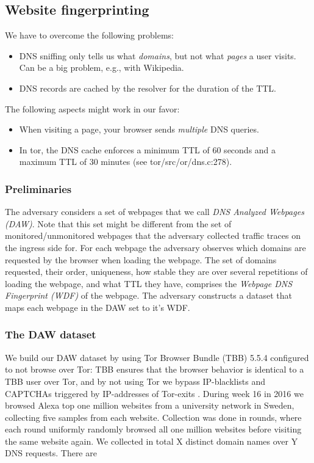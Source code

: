\subsection{Website fingerprinting}
We have to overcome the following problems:
\begin{itemize}
	\item DNS sniffing only tells us what \emph{domains}, but not what
		\emph{pages} a user visits.  Can be a big problem, e.g., with Wikipedia.
	\item DNS records are cached by the resolver for the duration of the TTL.
\end{itemize}

The following aspects might work in our favor:
\begin{itemize}
	\item When visiting a page, your browser sends \emph{multiple} DNS queries.
	\item In tor, the DNS cache enforces a minimum TTL of 60 seconds and a maximum
	TTL of 30 minutes (see tor/src/or/dns.c:278).
\end{itemize}


\subsubsection{Preliminaries}
The adversary considers a set of webpages that we call \emph{DNS
Analyzed Webpages (DAW)}. Note that this set might be different from the
set of monitored/unmonitored webpages that the adversary collected
traffic traces on the ingress side for.
For each webpage the adversary observes which domains are requested by
the browser when loading the webpage. The set of domains requested,
their order, uniqueness, how stable they are over several repetitions of
loading the webpage, and what TTL they have, comprises the
\emph{Webpage DNS Fingerprint (WDF)} of the webpage.
The adversary constructs a dataset that maps each webpage in the DAW set
to it's WDF.

\subsubsection{The DAW dataset}
We build our DAW dataset by using Tor Browser Bundle (TBB) 5.5.4
configured to not browse over Tor: TBB ensures that the browser behavior is
identical to a TBB user over Tor, and by not using Tor we bypass IP-blacklists
and CAPTCHAs triggered by IP-addresses of Tor-exits \cite{Khattak2016a}.
During week 16 in 2016 we browsed Alexa top one million websites from a
university network in Sweden, collecting five samples from each website.
Collection was done in rounds, where each round uniformly randomly browsed all one
million websites before visiting the same website again. We collected in total
X distinct domain names over Y DNS requests. There are

